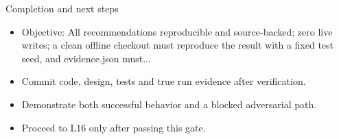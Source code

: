 \documentclass[aspectratio=169,10pt]{beamer}
\begin{document}
\begin{frame}{Completion and next steps}
\small
\begin{itemize}
\item Objective: All recommendations reproducible and source-backed; zero live writes; a clean offline checkout must reproduce the result with a fixed test seed, and evidence.json must...
\item Commit code, design, tests and true run evidence after verification.
\item Demonstrate both successful behavior and a blocked adversarial path.
\item Proceed to L16 only after passing this gate.
\end{itemize}

\end{frame}
\end{document}
